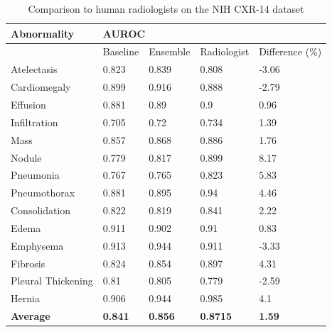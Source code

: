 \documentclass[oneside,a4paper]{article}
\begin{document}
\begin{table}[]
  \centering
  \begin{tabular}{lllll}
    \hline
    \textbf{Abnormality} & \multicolumn{4}{l}{\textbf{AUROC}}             \\ \hline
                         & Baseline & Ensemble & Radiologist & Difference (\%) \\ \hline
    Atelectasis          & 0.823    & 0.839    & 0.808       & -3.06      \\ \hline
    Cardiomegaly         & 0.899    & 0.916    & 0.888       & -2.79      \\ \hline
    Effusion             & 0.881    & 0.89     & 0.9         & 0.96       \\ \hline
    Infiltration         & 0.705    & 0.72     & 0.734       & 1.39       \\ \hline
    Mass                 & 0.857    & 0.868    & 0.886       & 1.76       \\ \hline
    Nodule               & 0.779    & 0.817    & 0.899       & 8.17       \\ \hline
    Pneumonia            & 0.767    & 0.765    & 0.823       & 5.83       \\ \hline
    Pneumothorax         & 0.881    & 0.895    & 0.94        & 4.46       \\ \hline
    Consolidation        & 0.822    & 0.819    & 0.841       & 2.22       \\ \hline
    Edema                & 0.911    & 0.902    & 0.91        & 0.83       \\ \hline
    Emphysema            & 0.913    & 0.944    & 0.911       & -3.33      \\ \hline
    Fibrosis             & 0.824    & 0.854    & 0.897       & 4.31       \\ \hline
    Pleural Thickening  & 0.81     & 0.805    & 0.779       & -2.59      \\ \hline
    Hernia               & 0.906    & 0.944    & 0.985       & 4.1        \\ \hline
    \textbf{Average}              & \textbf{0.841}    & \textbf{0.856}    & \textbf{0.8715}      & \textbf{1.59}       \\ \hline
  \end{tabular}
  \caption{Comparison to human radiologists on the NIH CXR-14 dataset}
  \label{tab:nih_comparision}
\end{table}

\clearpage
\end{document}
